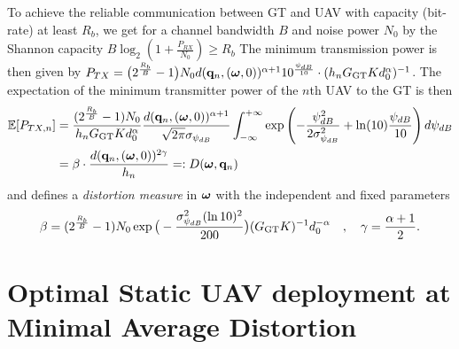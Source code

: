 \documentclass[smallabstract,smallcaptions]{dccpaper}
\newcommand{\Rb}{\ensuremath{R_b}}         %
\newcommand{\GGT}{\ensuremath{G_{\text{GT}}}}         %
\newcommand{\Dis}{\ensuremath{D}}                    %
\begin{document}
%
To achieve the reliable communication between GT and UAV with capacity (bit-rate) at least $\Rb$, we get for a
channel bandwidth $B$  and noise power $N_0$ by the Shannon capacity 
$B\log_2\left(1+\frac{P_{RX}}{N_0}\right)\ge\Rb$
The minimum transmission power is then given by
$P_{TX}=\big(2^{\frac{\Rb}{B}}-1\big)N_0d(\vq_n,(\vome,0))^{\alpha+1}10^{\frac{\psi_{dB}}{10}} \cdot  (h_n \GGT
Kd^{\alpha}_0)^{-1}$.
%
%
The expectation of the minimum transmitter power of the $n$th UAV to the GT is then 
%
\begin{align}
  \Expect{P_{TX,n}}& =
  \frac{(2^{\frac{\Rb}{B}}-1)N_0 }{ h_n \GGT Kd^{\alpha}_0}
   \frac{d(\vq_n,(\vome,0))^{\alpha+1}}{\sqrt{2\pi}\sigma_{\psi_{dB}}} \int_{-\infty}^{+\infty}
     \exp\left(-\frac{\psi^2_{dB}}{2\sigma^2_{\psi_{dB}}}+ \ln(10) \frac{\psi_{dB}}{10}\right)d\psi_{dB}\notag\\
  &=\bet \cdot  \frac{d( \vq_n,(\vome,0))^{2\gam}}{h_n}=:\Dis(\vome,\vq_n) \label{eq:Eptx}
\end{align}
%
and defines a \emph{distortion measure} in $\boldsymbol{ \omega}$ with the independent and fixed parameters
%
\begin{align}
  \bet=(2^{\frac{\Rb}{B}}-1) N_0 \exp\big(-\frac{\sig_{\psi_{dB}}^2 (\ln 10)^2}{200}\big)(\GGT K)^{-1} d_0^{-\alp}\quad,\quad
  \gam=\frac{\alp+1}{2}.
\end{align}
%


\section{Optimal Static UAV deployment at Minimal Average Distortion}
\end{document}
